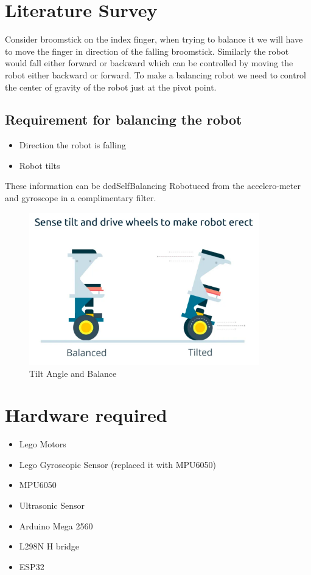 \documentclass{article}
\begin{document}
	\section{Literature Survey}
	Consider broomstick on the index finger, when trying to balance it we will have to move the finger in direction of the falling broomstick. Similarly the robot would fall either forward or backward which can be controlled by moving the robot either backward or forward.
	To make a balancing robot we need to control the center of gravity of the robot just at the pivot point. 
	\subsection{Requirement for balancing the robot}	
	\begin{itemize}
		\item Direction the robot is falling 
		\item Robot tilts
	\end{itemize}	
	These information can be dedSelfBalancing Robotuced from the accelero-meter and gyroscope in a complimentary filter.
	
	\begin{figure}[h]
		\centering
		\includegraphics[width=100mm,scale=0.5]{balance.png}
		\caption{Tilt Angle and Balance}
		\label{Tilt Angle and Balance}
	\end{figure}

\pagebreak
	\section{Hardware required}
	 \begin{itemize}
	 	\item Lego Motors   
	 	\item Lego Gyroscopic Sensor  (replaced it with MPU6050)
	 	\item MPU6050
	 	\item Ultrasonic Sensor
	 	\item Arduino Mega 2560
	 	\item L298N H bridge
	 	\item ESP32
	 \end{itemize}
 	
\end{document}
